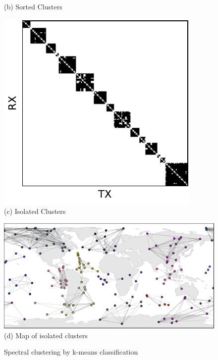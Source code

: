 \documentclass[conference]{IEEEtran}
\begin{document}
\begin{figure}[t!]
\begin{minipage}[b]{0.32\linewidth}
\begin{center}
      {\footnotesize(b) Sorted Clusters}
    \end{center}
  \end{minipage}
  \begin{minipage}[b]{0.32\linewidth}
    \begin{center}
      \includegraphics[width=\textwidth]{images/cluster_matrix.pdf} \\
      {\footnotesize(c) Isolated Clusters}
    \end{center}
  \end{minipage}
  \begin{minipage}[b]{\linewidth}
    \medskip
    \begin{center}
      \includegraphics[width=\textwidth]{images/clusters.pdf} \\
      {\footnotesize(d) Map of isolated clusters}
    \end{center}
  \end{minipage}
  \caption{Spectral clustering by k-means classification}
  \label{fig:clusters}
\end{figure}
\end{document}
